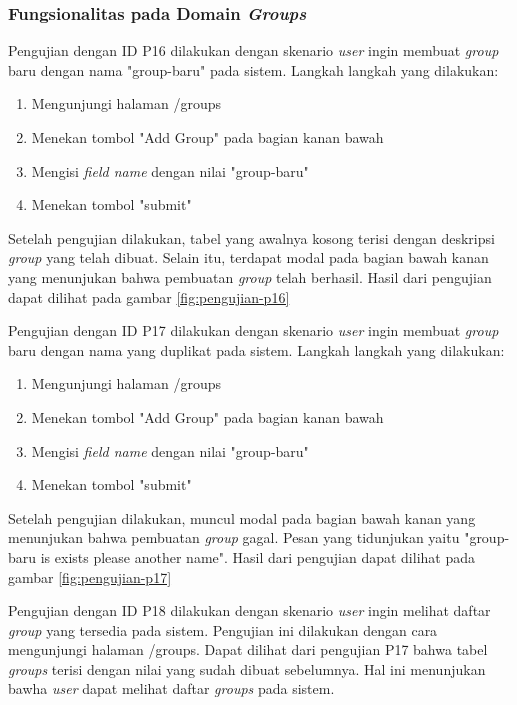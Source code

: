 \subsubsection{Fungsionalitas pada Domain \textit{Groups}}

Pengujian dengan ID P16 dilakukan dengan skenario \textit{user} ingin membuat \textit{group} baru dengan nama "group-baru" pada sistem. Langkah langkah yang dilakukan:
\begin{enumerate}
  \item Mengunjungi halaman /groups
  \item Menekan tombol "Add Group" pada bagian kanan bawah
  \item Mengisi \textit{field name} dengan nilai "group-baru"
  \item Menekan tombol "submit"
\end{enumerate}

Setelah pengujian dilakukan, tabel yang awalnya kosong terisi dengan deskripsi \textit{group} yang telah dibuat. Selain itu, terdapat modal pada bagian bawah kanan yang menunjukan bahwa pembuatan \textit{group} telah berhasil. Hasil dari pengujian dapat dilihat pada gambar \ref{fig:pengujian-p16}

Pengujian dengan ID P17 dilakukan dengan skenario \textit{user} ingin membuat \textit{group} baru dengan nama yang duplikat pada sistem. Langkah langkah yang dilakukan:
\begin{enumerate}
  \item Mengunjungi halaman /groups
  \item Menekan tombol "Add Group" pada bagian kanan bawah
  \item Mengisi \textit{field name} dengan nilai "group-baru"
  \item Menekan tombol "submit"
\end{enumerate}

Setelah pengujian dilakukan, muncul modal pada bagian bawah kanan yang menunjukan bahwa pembuatan \textit{group} gagal. Pesan yang tidunjukan yaitu "group-baru is exists please another name". Hasil dari pengujian dapat dilihat pada gambar \ref{fig:pengujian-p17}

Pengujian dengan ID P18 dilakukan dengan skenario \textit{user} ingin melihat daftar \textit{group} yang tersedia pada sistem. Pengujian ini dilakukan dengan cara mengunjungi halaman /groups. Dapat dilihat dari pengujian P17 bahwa tabel \textit{groups} terisi dengan nilai yang sudah dibuat sebelumnya. Hal ini menunjukan bawha \textit{user} dapat melihat daftar \textit{groups} pada sistem.

